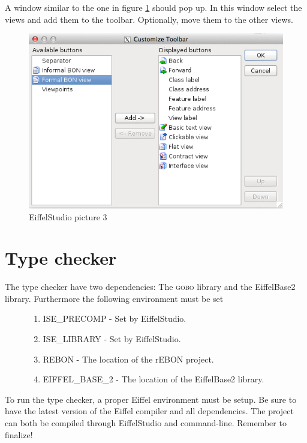 A window similar to the one in figure \ref{fig:EiffelStudio3} should pop up. In this window select the \bon{} views and add them to the toolbar. Optionally, move them to the other views.

\begin{figure}[H]
\centering
\includegraphics[scale=0.8]{images/es3.png}
\caption{EiffelStudio picture 3}
\label{fig:EiffelStudio3}
\end{figure}

\section{Type checker}

The type checker have two dependencies: The \textsc{gobo} library and the EiffelBase2 library. Furthermore the following environment must be set
\begin{figure}[H]
\begin{enumerate}
\item ISE\_PRECOMP - Set by EiffelStudio.
\item ISE\_LIBRARY - Set by EiffelStudio.
\item REBON - The location of the rEBON project.
\item EIFFEL\_BASE\_2 - The location of the EiffelBase2 library.
\end{enumerate}
\end{figure}
To run the type checker, a proper Eiffel environment must be setup. Be sure to have the latest version of the Eiffel compiler and all dependencies. The project can both be compiled through EiffelStudio and command-line. Remember to finalize!
